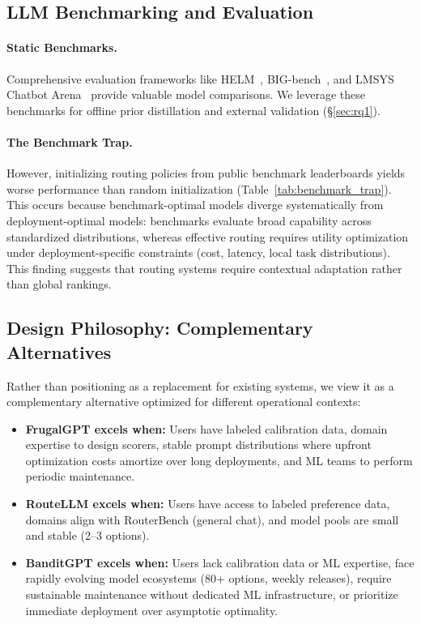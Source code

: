 \subsection{LLM Benchmarking and Evaluation}

\paragraph{Static Benchmarks.} Comprehensive evaluation frameworks like HELM~\cite{liang2022holistic}, BIG-bench~\cite{srivastava2022beyond}, and LMSYS Chatbot Arena~\cite{zheng2023judging} provide valuable model comparisons. We leverage these benchmarks for offline prior distillation and external validation (\S\ref{sec:rq1}).

\paragraph{The Benchmark Trap.} However, initializing routing policies from public benchmark leaderboards yields worse performance than random initialization (Table~\ref{tab:benchmark_trap}). This occurs because benchmark-optimal models diverge systematically from deployment-optimal models: benchmarks evaluate broad capability across standardized distributions, whereas effective routing requires utility optimization under deployment-specific constraints (cost, latency, local task distributions). This finding suggests that routing systems require contextual adaptation rather than global rankings.

\subsection{Design Philosophy: Complementary Alternatives}

Rather than positioning \ours{} as a replacement for existing systems, we view it as a complementary alternative optimized for different operational contexts:

\begin{itemize}[leftmargin=*,nosep]
    \item \textbf{FrugalGPT excels when:} Users have labeled calibration data, domain expertise to design scorers, stable prompt distributions where upfront optimization costs amortize over long deployments, and ML teams to perform periodic maintenance.
    \item \textbf{RouteLLM excels when:} Users have access to labeled preference data, domains align with RouterBench (general chat), and model pools are small and stable (2--3 options).
    \item \textbf{BanditGPT excels when:} Users lack calibration data or ML expertise, face rapidly evolving model ecosystems (80+ options, weekly releases), require sustainable maintenance without dedicated ML infrastructure, or prioritize immediate deployment over asymptotic optimality.
\end{itemize}

